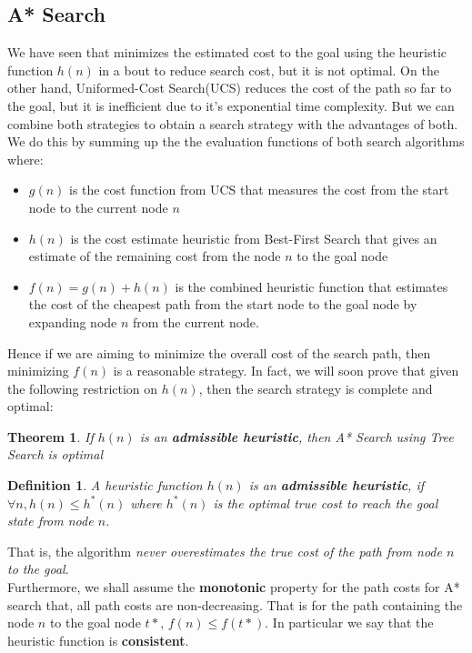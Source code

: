 \documentclass[12pt]{article}
\newtheorem{theorem}{Theorem}
\newtheorem{definition}{Definition}
\begin{document}
\subsection{A* Search}

We have seen that minimizes the estimated cost to the goal using the heuristic function $h(n)$ in a bout to reduce search cost, but it is not optimal. On the other hand, Uniformed-Cost Search(UCS) reduces the cost of the path so far to the goal, but it is inefficient due to it's exponential time complexity. But we can combine both strategies to obtain a search strategy with the advantages of both. We do this by summing up the the evaluation functions of both search algorithms where:

\begin{itemize}
\item $g(n)$ is the cost function from UCS that measures the cost from the start node to the current node $n$
\item $h(n)$ is the cost estimate heuristic from Best-First Search that gives an estimate of the remaining cost from the node $n$ to the goal node
\item $f(n) = g(n) + h(n)$ is the combined heuristic function that estimates the cost of the cheapest path from the start node to the goal node by expanding node $n$ from the current node.
\end{itemize}

Hence if we are aiming to minimize the overall cost of the search path, then minimizing $f(n)$ is a reasonable strategy. In fact, we will soon prove that given the following restriction on $h(n)$, then the search strategy is complete and optimal:

\begin{theorem}
If $h(n)$ is an \textbf{admissible heuristic}, then A* Search using Tree Search is optimal
\end{theorem}

\begin{definition}
A heuristic function $h(n)$ is an \textbf{admissible heuristic}, if $\forall n, h(n) \leq h^*(n)$ where $h^*(n)$ is the optimal true cost to reach the goal state from node $n$. 
\end{definition}

That is, the algorithm \textit{never overestimates the true cost of the path from node $n$ to the goal}.\\

Furthermore, we shall assume the \textbf{monotonic} property for the path costs for A* search that, all path costs are non-decreasing. That is for the path containing the node $n$ to the goal node $t*$, $f(n) \leq f(t*)$. In particular we say that the heuristic function is \textbf{consistent}.
\end{document}
